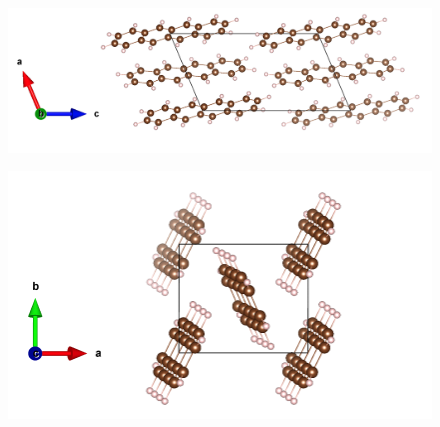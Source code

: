  \begin{figure}[h]
 	\centering
 	\includegraphics[scale=0.7]{image/T-b}
 \end{figure}
 
 \begin{figure}[h]
 	\centering
 	\includegraphics[scale=0.7]{image/T-c}
 \end{figure}
 
